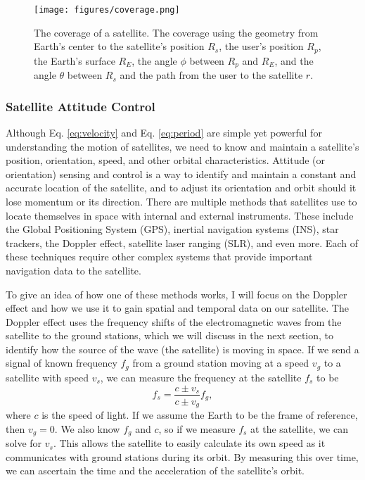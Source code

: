 \documentclass[10pt]{article}
\begin{document}
\begin{figure}[h!]
\centering
\texttt{[image: figures/coverage.png]}
\caption{The coverage of a satellite. The coverage using the geometry from Earth's center to the satellite's position $R_s$, the user's position $R_p$, the Earth's surface $R_E$, the angle $\phi$ between $R_p$ and $R_E$, and the angle $\theta$ between $R_s$ and the path from the user to the satellite $r$\cite{richharia_westbrook_2010}.}
\label{fig:coverage}
\end{figure}

\subsubsection{Satellite Attitude Control}
\label{attitude_control}

Although Eq. \ref{eq:velocity} and Eq. \ref{eq:period} are simple yet powerful for understanding the motion of satellites, we need to know and maintain a satellite's position, orientation, speed, and other orbital characteristics. Attitude (or orientation) sensing and control is a way to identify and maintain a constant and accurate location of the satellite, and to adjust its orientation and orbit should it lose momentum or its direction\cite{Travis20}. There are multiple methods that satellites use to locate themselves in space with internal and external instruments\cite{nasa_attitude}. These include the Global Positioning System (GPS), inertial navigation systems (INS), star trackers, the Doppler effect, satellite laser ranging (SLR), and even more. Each of these techniques require other complex systems that provide important navigation data to the satellite. 

To give an idea of how one of these methods works, I will focus on the Doppler effect and how we use it to gain spatial and temporal data on our satellite. The Doppler effect uses the frequency shifts of the electromagnetic waves from the satellite to the ground stations, which we will discuss in the next section, to identify how the source of the wave (the satellite) is moving in space. If we send a signal of known frequency $f_g$ from a ground station moving at a speed $v_g$ to a satellite with speed $v_s$, we can measure the frequency at the satellite $f_s$ to be
\begin{equation}
f_s = \frac{c\pm v_s}{c\pm v_g}f_g,
    \label{eq:doppler}
\end{equation}
where $c$ is the speed of light. If we assume the Earth to be the frame of reference, then $v_g = 0$. We also know $f_g$ and $c$, so if we measure $f_s$ at the satellite, we can solve for $v_s$. This allows the satellite to easily calculate its own speed as it communicates with ground stations during its orbit\cite{Rosen_Gothard_2010}\cite{pedrotti_pedrotti_pedrotti_2019}. By measuring this over time, we can ascertain the time and the acceleration of the satellite's orbit.
\end{document}
